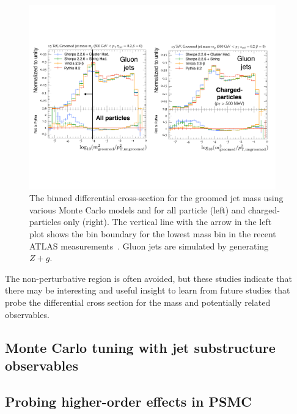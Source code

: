 \documentclass[11pt]{cernrep}
\begin{document}
\begin{figure}[h!]
\centering
\includegraphics[width=0.95\textwidth]{figs/NPbumptracks.pdf}
\caption{The binned differential cross-section for the groomed jet mass using various Monte Carlo models and for all particle (left) and charged-particles only (right).  The vertical line with the arrow in the left plot shows the bin boundary for the lowest mass bin in the recent ATLAS measurements~\cite{Aaboud:2017qwh,Aad:2019vyi}.  Gluon jets are simulated by generating $Z+g$.}
\label{fig:jets:np:tracks}
\end{figure}

The non-perturbative region is often avoided, but these studies indicate that there may be interesting and useful insight to learn from future studies that probe the differential cross section for the mass and potentially related observables.

\clearpage

\subsection{Monte Carlo tuning with jet substructure observables}
\label{sec:jets:mc}




\subsection{Probing higher-order effects in PSMC}
\label{sec:jets:psmc}

\end{document}
